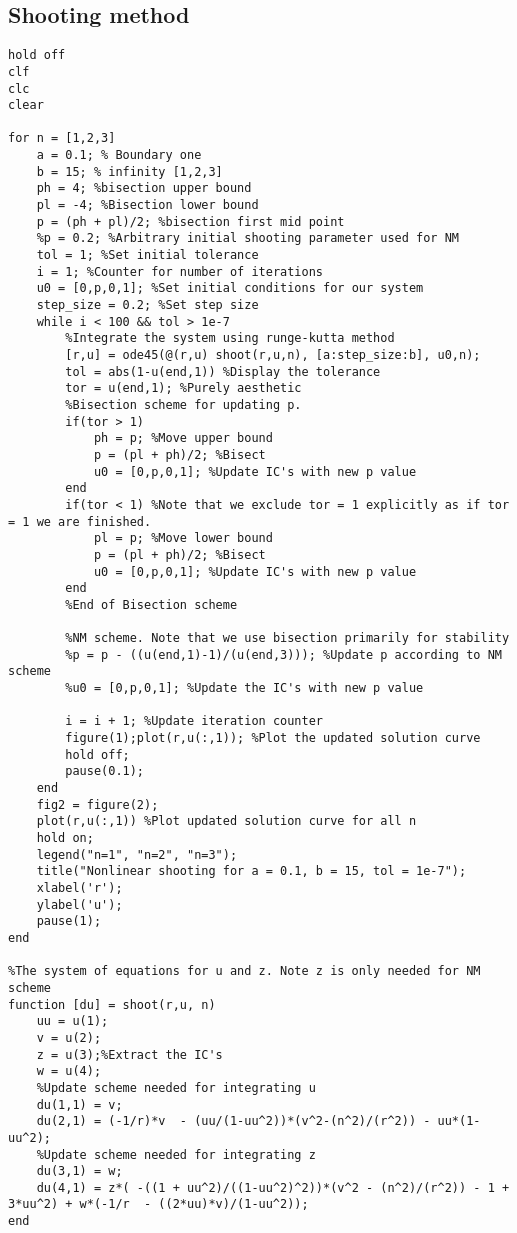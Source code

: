 \documentclass{article}
\begin{document}
\subsection{Shooting method}
\begin{lstlisting}
hold off
clf
clc
clear

for n = [1,2,3]
    a = 0.1; % Boundary one
    b = 15; % infinity [1,2,3]
    ph = 4; %bisection upper bound
    pl = -4; %Bisection lower bound
    p = (ph + pl)/2; %bisection first mid point
    %p = 0.2; %Arbitrary initial shooting parameter used for NM
    tol = 1; %Set initial tolerance
    i = 1; %Counter for number of iterations
    u0 = [0,p,0,1]; %Set initial conditions for our system
    step_size = 0.2; %Set step size 
    while i < 100 && tol > 1e-7
        %Integrate the system using runge-kutta method
        [r,u] = ode45(@(r,u) shoot(r,u,n), [a:step_size:b], u0,n);
        tol = abs(1-u(end,1)) %Display the tolerance
        tor = u(end,1); %Purely aesthetic
        %Bisection scheme for updating p.
        if(tor > 1)
            ph = p; %Move upper bound
            p = (pl + ph)/2; %Bisect
            u0 = [0,p,0,1]; %Update IC's with new p value
        end
        if(tor < 1) %Note that we exclude tor = 1 explicitly as if tor = 1 we are finished.
            pl = p; %Move lower bound
            p = (pl + ph)/2; %Bisect
            u0 = [0,p,0,1]; %Update IC's with new p value
        end
        %End of Bisection scheme
        
        %NM scheme. Note that we use bisection primarily for stability
        %p = p - ((u(end,1)-1)/(u(end,3))); %Update p according to NM scheme
        %u0 = [0,p,0,1]; %Update the IC's with new p value
        
        i = i + 1; %Update iteration counter
        figure(1);plot(r,u(:,1)); %Plot the updated solution curve
        hold off;
        pause(0.1);
    end
    fig2 = figure(2);
    plot(r,u(:,1)) %Plot updated solution curve for all n
    hold on;
    legend("n=1", "n=2", "n=3");
    title("Nonlinear shooting for a = 0.1, b = 15, tol = 1e-7");
    xlabel('r');
    ylabel('u');
    pause(1);
end

%The system of equations for u and z. Note z is only needed for NM scheme
function [du] = shoot(r,u, n)
    uu = u(1);
    v = u(2);
    z = u(3);%Extract the IC's
    w = u(4);
    %Update scheme needed for integrating u
    du(1,1) = v;
    du(2,1) = (-1/r)*v  - (uu/(1-uu^2))*(v^2-(n^2)/(r^2)) - uu*(1-uu^2);
    %Update scheme needed for integrating z
    du(3,1) = w;
    du(4,1) = z*( -((1 + uu^2)/((1-uu^2)^2))*(v^2 - (n^2)/(r^2)) - 1 + 3*uu^2) + w*(-1/r  - ((2*uu)*v)/(1-uu^2));
end
\end{lstlisting}
\pagebreak
\end{document}
